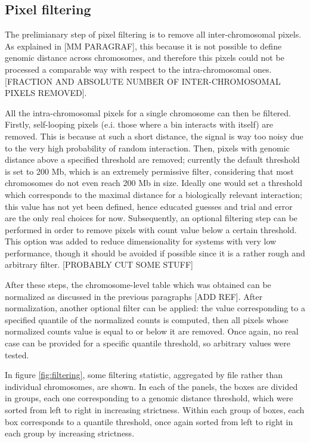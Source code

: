 \subsection{Pixel filtering}

The prelimianary step of pixel filtering is to remove all inter-chromosomal pixels. As explained in [MM PARAGRAF], this because it is not possible to define genomic distance across chromosomes, and therefore this pixels could not be processed a comparable way with respect to the intra-chromosomal ones. [FRACTION AND ABSOLUTE NUMBER OF INTER-CHROMOSOMAL PIXELS REMOVED].

All the intra-chromosomal pixels for a single chromosome can then be filtered. Firstly, self-looping pixels (e.i. those where a bin interacts with itself) are removed. This is because at such a short distance, the signal is way too noisy due to the very high probability of random interaction. Then, pixels with genomic distance above a specified threshold are removed; currently the default threshold is set to 200 Mb, which is an extremely permissive filter, considering that most chromosomes do not even reach 200 Mb in size. Ideally one would set a threshold which corresponds to the maximal distance for a biologically relevant interaction; this value has not yet been defined, hence educated guesses and trial and error are the only real choices for now. Subsequently, an optional filtering step can be performed in order to remove pixels with count value below a certain threshold. This option was added to reduce dimensionality for systems with very low performance, though it should be avoided if possible since it is a rather rough and arbitrary filter. [PROBABLY CUT SOME STUFF]

After these steps, the chromosome-level table which was obtained can be normalized as discussed in the previous paragraphs [ADD REF]. After normalization, another optional filter can be applied: the value corresponding to a specified quantile of the normalized counts is computed, then all pixels whose normalized counts value is equal to or below it are removed. Once again, no real case can be provided for a specific quantile threshold, so arbitrary values were tested. 

In figure \ref{fig:filtering}, some filtering statistic, aggregated by file rather than individual chromosomes, are shown. In each of the panels, the boxes are divided in groups, each one corresponding to a genomic distance threshold, which were sorted from left to right in increasing strictness. Within each group of boxes, each box corresponds to a quantile threshold, once again sorted from left to right in each group by increasing strictness.   

